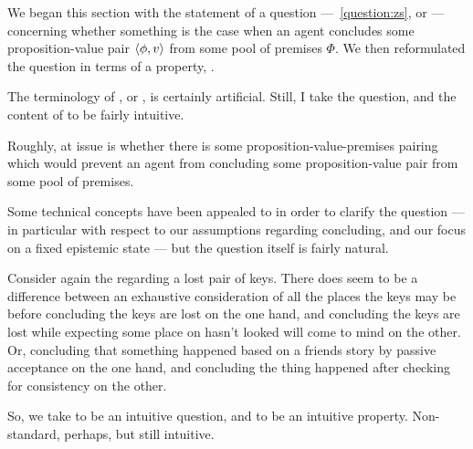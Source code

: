 \begin{note}
  We began this section with the statement of a question ---~\autoref{question:zs}, or \qzS{}  --- concerning whether something is the case when an agent concludes some proposition-value pair \(\langle \phi, v \rangle\) from some pool of premises \(\Phi\).
  We then reformulated the question in terms of a property, \zS{}.

  The terminology of \zS{}, or , is certainly artificial.
  Still, I take the question, and the content of \zS{} to be fairly intuitive.

  Roughly, at issue is whether there is some proposition-value-premises pairing which would prevent an agent from concluding some proposition-value pair from some pool of premises.

  Some technical concepts have been appealed to in order to clarify the question --- in particular with respect to our assumptions regarding concluding, and our focus on a fixed epistemic state --- but the question itself is fairly natural.

  Consider again the  regarding a lost pair of keys.
  There does seem to be a difference between an exhaustive consideration of all the places the keys may be before concluding the keys are lost on the one hand, and concluding the keys are lost while expecting some place on hasn't looked will come to mind on the other.
  Or, concluding that something happened based on a friends story by passive acceptance on the one hand, and concluding the thing happened after checking for consistency on the other.

  So, we take \qzS{} to be an intuitive question, and \zS{} to be an intuitive property.
  Non-standard, perhaps, but still intuitive.
\end{note}

